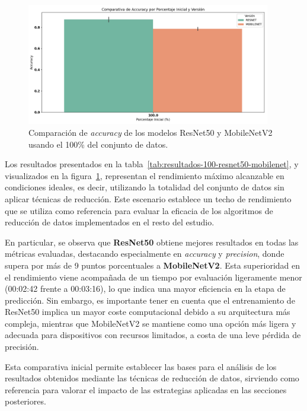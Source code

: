 \begin{figure}[htp]
    \centering
    \includegraphics[width=0.95\textwidth]{imagenes/evaluaciones/comparacion_modelos_100}
    \caption{Comparación de \textit{accuracy} de los modelos ResNet50 y MobileNetV2 usando el 100\% del conjunto de datos.}
    \label{fig:comparacion_modelos_100}
\end{figure}

Los resultados presentados en la tabla~\ref{tab:resultados-100-resnet50-mobilenet}, y visualizados en la figura~\ref{fig:comparacion_modelos_100},
representan el rendimiento máximo alcanzable en condiciones ideales,
es decir, utilizando la totalidad del conjunto de datos sin aplicar técnicas de reducción.
Este escenario establece un techo de rendimiento que se utiliza como referencia para evaluar la eficacia de
los algoritmos de reducción de datos implementados en el resto del estudio.

En particular, se observa que \textbf{ResNet50} obtiene mejores resultados en todas las métricas evaluadas,
destacando especialmente en \textit{accuracy} y \textit{precision}, donde supera por más de 9 puntos porcentuales a \textbf{MobileNetV2}.
Esta superioridad en el rendimiento viene acompañada de un tiempo por evaluación ligeramente menor (00:02:42 frente a 00:03:16),
lo que indica una mayor eficiencia en la etapa de predicción.
Sin embargo, es importante tener en cuenta que el entrenamiento de ResNet50 implica un mayor coste computacional debido a su arquitectura más compleja,
mientras que MobileNetV2 se mantiene como una opción más ligera y adecuada para dispositivos con recursos limitados, a costa de una leve pérdida de precisión.

Esta comparativa inicial permite establecer las bases para el análisis de los resultados obtenidos mediante las técnicas de reducción de datos,
sirviendo como referencia para valorar el impacto de las estrategias aplicadas en las secciones posteriores.


